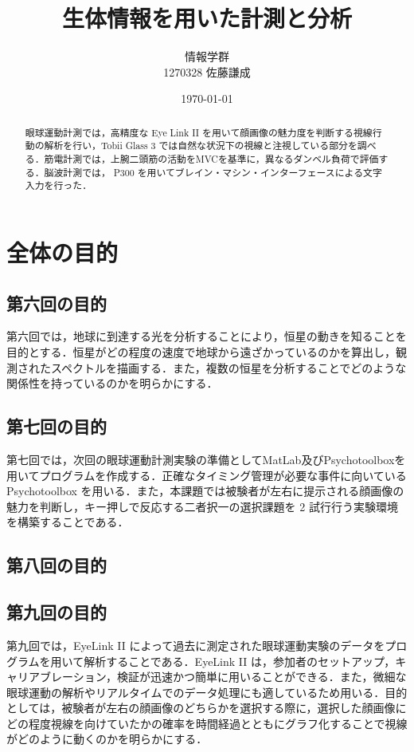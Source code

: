 \documentclass[dvipdfmx, titlepage, t]{jsarticle}
\title{生体情報を用いた計測と分析}
\author{情報学群 \\ 1270328 佐藤謙成}
\date{\today}
\begin{document}
\maketitle

\begin{abstract}
    眼球運動計測では，高精度な Eye Link II を用いて顔画像の魅力度を判断する視線行動の解析を行い，Tobii Glass 3 では自然な状況下の視線と注視している部分を調べる．筋電計測では，上腕二頭筋の活動をMVCを基準に，異なるダンベル負荷で評価する．脳波計測では， P300 を用いてブレイン・マシン・インターフェースによる文字入力を行った．
\end{abstract}


\section{全体の目的}
\subsection{第六回の目的}
    第六回では，地球に到達する光を分析することにより，恒星の動きを知ることを目的とする．恒星がどの程度の速度で地球から遠ざかっているのかを算出し，観測されたスペクトルを描画する．また，複数の恒星を分析することでどのような関係性を持っているのかを明らかにする．

\subsection{第七回の目的}
    第七回では，次回の眼球運動計測実験の準備としてMatLab及びPsychotoolboxを用いてプログラムを作成する．正確なタイミング管理が必要な事件に向いている Psychotoolbox を用いる．また，本課題では被験者が左右に提示される顔画像の魅力を判断し，キー押しで反応する二者択一の選択課題を 2 試行行う実験環境を構築することである．
\subsection{第八回の目的}

\subsection{第九回の目的}
    第九回では，EyeLink II によって過去に測定された眼球運動実験のデータをプログラムを用いて解析することである．EyeLink II は，参加者のセットアップ，キャリアブレーション，検証が迅速かつ簡単に用いることができる．また，微細な眼球運動の解析やリアルタイムでのデータ処理にも適しているため用いる．目的としては，被験者が左右の顔画像のどちらかを選択する際に，選択した顔画像にどの程度視線を向けていたかの確率を時間経過とともにグラフ化することで視線がどのように動くのかを明らかにする．
\end{document}
